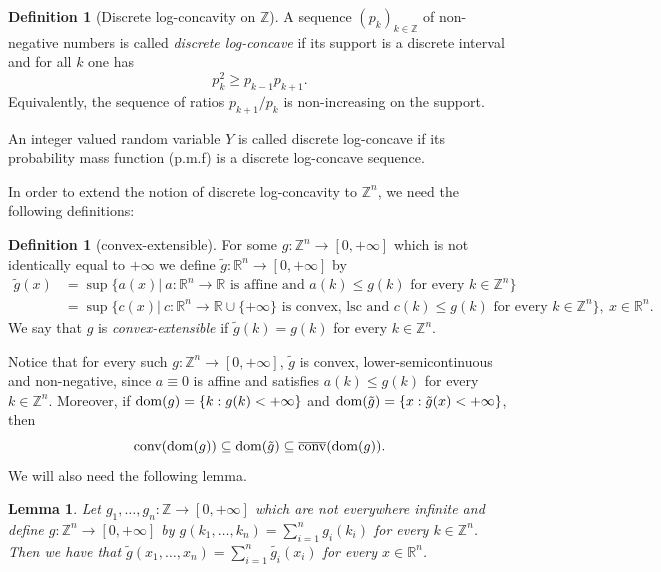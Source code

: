 \documentclass[11pt,a4paper]{article} %
\newtheorem{lemma}[theorem]{Lemma}
\theoremstyle{definition}
\newtheorem{definition}[theorem]{Definition}
\theoremstyle{remark}
\newcommand{\conv}{\mathrm{conv}}
\newcommand{\1}{\mathds{1}}
\begin{document}
\begin{definition}[Discrete log-concavity on $\mathbb{Z}$]\label{def:one-dimension}
A sequence $(p_k)_{k\in\mathbb Z}$ of non-negative numbers is called \emph{discrete log-concave} if its support is a discrete interval and for all $k$ one has
\[ p_k^2\ge p_{k-1}p_{k+1}.\]
Equivalently,  the sequence of ratios $p_{k+1}/p_k$ is non-increasing on the support.

An integer valued random variable $Y$ is called discrete log-concave if its probability mass function (p.m.f) is a discrete log-concave sequence.
\end{definition}




In order to extend the notion of discrete log-concavity to $\mathbb{Z}^n$, we need the following definitions:

\begin{definition}[convex-extensible]\label{def:convex-extension}
    For some $g: \mathbb{Z}^n \to [0,+\infty]  $ which is not identically equal to $+\infty$ we define $\tilde{g}: \mathbb{R}^n \to [0,+\infty]$ by \begin{align*}
        \tilde{g}(x) &=\sup \{ a(x)| \ a:\mathbb{R}^n \to \mathbb{R} \text{  is affine and } a(k) \leq g(k) \text{ for every } k \in \mathbb{Z}^n \} 
        \\
        &=\sup \{ c(x)| \ c: \mathbb{R}^n \to \mathbb{R} \cup \{+\infty\} \text{ is convex, lsc and } c(k)\leq g(k) \text{ for every } k \in \mathbb{Z}^n \}, \ x \in \mathbb{R}^n.
    \end{align*}
    We say that $g$ is \textit{convex-extensible} if $\tilde{g}(k)=g(k)$ for every $k \in \mathbb{Z}^n$.
\end{definition}

Notice that for every such $g: \mathbb{Z}^n \to [0,+\infty]$, $\tilde{g}$ is convex, lower-semicontinuous and non-negative, since $a\equiv 0$ is affine and satisfies $a(k) \leq g(k)$ for every $k \in \mathbb{Z}^n$. Moreover, if ${\rm dom}(g)=\{k : g(k) < +\infty\}$ and ${\rm dom}(\tilde{g})=\{x:\tilde g(x) < +\infty\}$, then $$\conv({\rm dom}(g)) \subseteq {\rm dom}(\tilde{g}) \subseteq \overline{\conv}({\rm dom}(g)).$$ We will also need the following lemma.

\begin{lemma}\label{lem:separability}
    Let $g_1,\ldots,g_n : \mathbb{Z} \to [0,+\infty]$ which are not everywhere infinite and define $g: \mathbb{Z}^n \to [0,+\infty]$ by $g(k_1,\ldots,k_n)= \sum\limits_{i=1}^{n}g_i(k_i)$ for every $k \in \mathbb{Z}^n$. Then we have that $\tilde{g}(x_1,\ldots,x_n)=\sum\limits_{i=1}^{n}\tilde{g_i}(x_i)$ for every $x \in \mathbb{R}^n$.
\end{lemma}
\end{document}
